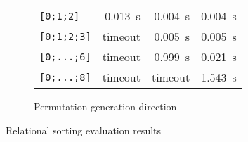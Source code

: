 \begin{figure*}[t!]
\begin{subfigure}[b]{0.48\textwidth}
\begin{tabular}{l||c|r||r}
      \texttt{{[}0;1;2{]}}   & \multicolumn{1}{r|}{\SI{0.013}{s}}                                            & \SI{0.004}{s}                                                                   & \SI{0.004}{s}                                          \\
      \texttt{{[}0;1;2;3{]}} & timeout                                                                       & \SI{0.005}{s}                                                                   & \SI{0.005}{s}                                          \\
      \texttt{{[}0;...;6{]}} & timeout                                                                       & \SI{0.999}{s}                                                                   & \SI{0.021}{s}                                          \\
      \texttt{{[}0;...;8{]}} & timeout                                                                       & \multicolumn{1}{c||}{timeout}                                                   & \SI{1.543}{s}
      \end{tabular}
    \caption{Permutation generation direction}
    \label{tbl:sort_perm}
  \end{subfigure}
  \caption{Relational sorting evaluation results}
  \label{tbl:sort}
\end{figure*}
